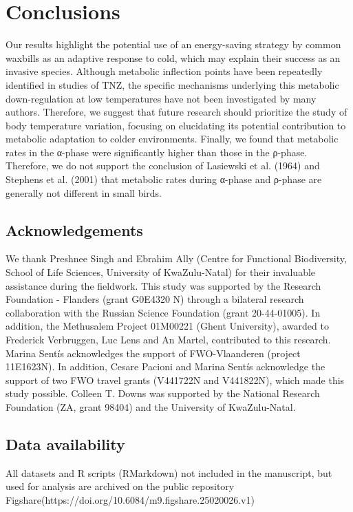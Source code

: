 \documentclass[10pt, twoside]{book} %
\begin{document}
\section{Conclusions}
Our results highlight the potential use of an energy-saving strategy by common waxbills as an adaptive response to cold, which may explain their success as an invasive species. Although metabolic inflection points have been repeatedly identified in studies of TNZ, the specific mechanisms underlying this metabolic down-regulation at low temperatures have not been investigated by many authors. Therefore, we suggest that future research should prioritize the study of body temperature variation, focusing on elucidating its potential contribution to metabolic adaptation to colder environments. Finally, we found that metabolic rates in the α-phase were significantly higher than those in the ρ-phase. Therefore, we do not support the conclusion of Lasiewski et al. (1964) and Stephens et al. (2001) that metabolic rates during α-phase and ρ-phase are generally not different in small birds.\\

\subsection*{Acknowledgements}
We thank Preshnee Singh and Ebrahim Ally (Centre for Functional Biodiversity, School of Life Sciences, University of KwaZulu-Natal) for their invaluable assistance during the fieldwork. This study was supported by the Research Foundation - Flanders (grant G0E4320 N) through a bilateral research collaboration with the Russian Science Foundation (grant 20-44-01005). In addition, the Methusalem Project 01M00221 (Ghent University), awarded to Frederick Verbruggen, Luc Lens and An Martel, contributed to this research. Marina Sentís acknowledges the support of FWO-Vlaanderen (project 11E1623N). In addition, Cesare Pacioni and Marina Sentís acknowledge the support of two FWO travel grants (V441722N and V441822N), which made this study possible. Colleen T. Downs was supported by the National Research Foundation (ZA, grant 98404) and the University of KwaZulu-Natal.\\

\subsection*{Data availability}
All datasets and R scripts (RMarkdown) not included in the manuscript, but used for analysis are archived on the public repository Figshare\newline (https://doi.org/10.6084/m9.figshare.25020026.v1)
 \newpage
\end{document}
